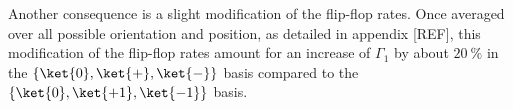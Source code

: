\documentclass[a4paper,11pt]{report}
\begin{document}
Another consequence is a slight modification of the flip-flop rates. Once averaged over all possible orientation and position, as detailed in appendix [REF], this modification of the flip-flop rates amount for an increase of $\Gamma_1$ by about $20\ \%$ in the $\{ \ket{0}, \ket{+},\ket{-} \}$ basis compared to the $\{ \ket{0}, \ket{+1},\ket{-1} \}$ basis.
%
%
%
%
\end{document}
